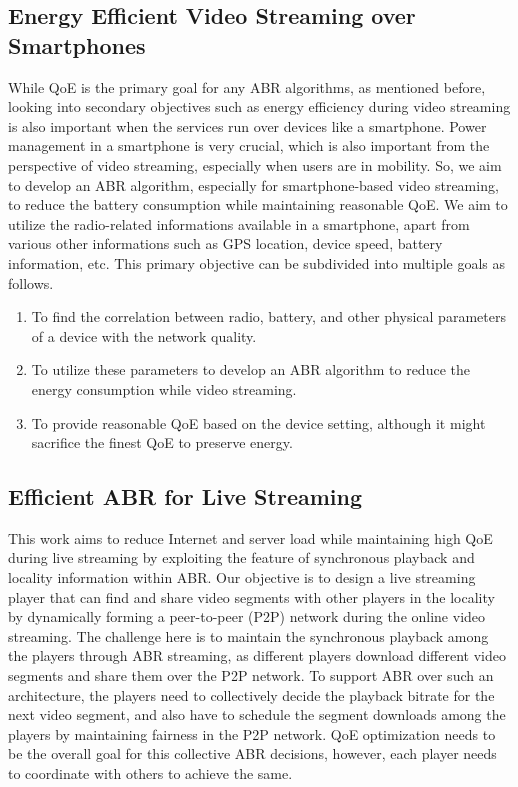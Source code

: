 \subsection{Energy Efficient Video Streaming over Smartphones}
While QoE is the primary goal for any ABR algorithms, as mentioned before, looking into secondary objectives such as energy efficiency during video streaming is also important when the services run over devices like a smartphone. Power management in a smartphone is very crucial, which is also important from the perspective of video streaming, especially when users are in mobility. So, we aim to develop an ABR algorithm, especially for smartphone-based video streaming, to reduce the battery consumption while maintaining reasonable QoE. We aim to utilize the radio-related informations available in a smartphone, apart from various other informations such as GPS location, device speed, battery information, etc. This primary objective can be subdivided into multiple goals as follows.
\begin{enumerate}
	\item To find the correlation between radio, battery, and other physical parameters of a device with the network quality.
	\item To utilize these parameters to develop an ABR algorithm to reduce the energy consumption while video streaming.
	\item To provide reasonable QoE based on the device setting, although it might sacrifice the finest QoE to preserve energy.
\end{enumerate}

\subsection{Efficient ABR for Live Streaming}
This work aims to reduce Internet and server load while maintaining high QoE during live streaming by exploiting the feature of synchronous playback and locality information within ABR. Our objective is to design a live streaming player that can find and share video segments with other players in the locality by dynamically forming a peer-to-peer (P2P) network during the online video streaming. The challenge here is to maintain the synchronous playback among the players through ABR streaming, as different players download different video segments and share them over the P2P network. To support ABR over such an architecture, the players need to collectively decide the playback bitrate for the next video segment, and also have to schedule the segment downloads among the players by maintaining fairness in the P2P network. QoE optimization needs to be the overall goal for this collective ABR decisions, however, each player needs to coordinate with others to achieve the same. 

